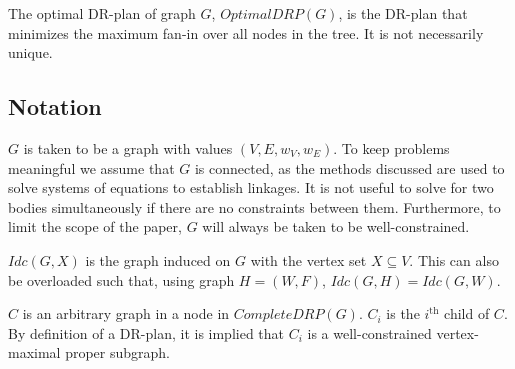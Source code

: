 \documentclass[11pt]{article}
\begin{document}
\begin{definition}
The optimal DR-plan of graph $G$, $OptimalDRP(G)$, is the DR-plan that minimizes the maximum fan-in over all nodes in the tree. It is not necessarily unique.
\end{definition}



\subsection{Notation}
$G$ is taken to be a graph with values $(V,E,w_V,w_E)$. To keep problems meaningful we assume that $G$ is connected, as the methods discussed are used to solve systems of equations to establish linkages. It is not useful to solve for two bodies simultaneously if there are no constraints between them. Furthermore, to limit the scope of the paper, $G$ will always be taken to be well-constrained.

$Idc(G,X)$ is the graph induced on $G$ with the vertex set $X\subseteq V$. This can also be overloaded such that, using graph $H=(W,F)$, $Idc(G,H)=Idc(G,W)$.

$C$ is an arbitrary graph in a node in $CompleteDRP(G)$. $C_i$ is the $i^{\text{th}}$ child of $C$. By definition of a DR-plan, it is implied that $C_i$ is a well-constrained vertex-maximal proper subgraph.


\end{document}
